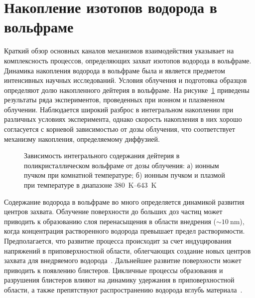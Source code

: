 \section{Накопление изотопов водорода в вольфраме}\label{sec:ch1/sec5}

Краткий обзор основных каналов механизмов взаимодействия указывает на комплексность процессов, определяющих захват изотопов водорода в вольфраме. Динамика накопления водорода в вольфраме была и является предметом интенсивных научных исследований. Условия облучения и подготовка образцов определяют долю накопленного дейтерия в вольфраме. На рисунке~\cref{fig:ch1/retention_fluence} приведены результаты ряда экспериментов, проведенных при ионном и плазменном облучении. Наблюдается широкий разброс в интегральном накоплении при различных условиях эксперимента, однако скорость накопления в них хорошо согласуется с корневой зависимостью от дозы облучения, что соответствует механизму накопления, определяемому диффузией.  

\begin{figure}[ht]
    \caption{Зависимость интегрального содержания дейтерия в поликристаллическом вольфраме от дозы облучения: а) ионным пучком при комнатной температуре; б) ионным пучком и плазмой при температуре в диапазоне \SIrange{380}{643}{\kelvin}~\cite{HarutunyanThesis}}\label{fig:ch1/retention_fluence}
\end{figure}

Содержание водорода в вольфраме во много определяется динамикой развития центров захвата. Облучение поверхности до больших доз частиц может приводить к образованию слоя перенасыщения в области внедрения (\( \sim \SI{10}{\nano\meter} \)), когда концентрация растворенного водорода превышает предел растворимости. Предполагается, что развитие процесса происходит за счет индуцирования напряжений в приповерхностной области, облегчающих создание новых центров захвата для внедряемого водорода~\cite{Nishijima2023}. Дальнейшее развитие поверхности может приводить к появлению блистеров. Цикличные процессы образования и разрушения блистеров влияют на динамику удержания в приповерхностной области, а также препятствуют распространению водорода вглубь материала~\cite{Bauer2017}.  

